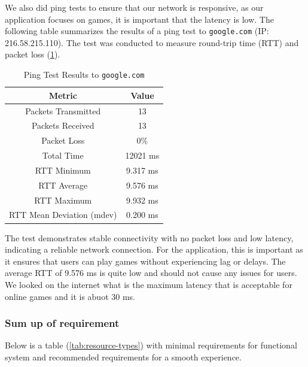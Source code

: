 \documentclass[]{VUMIFTemplateClass}
\begin{document}
We also did ping tests to ensure that our network is responsive, as our application focuses on games, it is important that the latency is low.
The following table summarizes the results of a ping test to \texttt{google.com} (IP: 216.58.215.110). The test was conducted to measure round-trip time (RTT) and packet loss (\ref{tab:ping-test-results}).
\begin{table}[H]
    \centering
    \begin{tabular}{|c|c|}
        \hline
        \textbf{Metric} & \textbf{Value} \\
        \hline
        Packets Transmitted & 13 \\
        \hline
        Packets Received & 13 \\
        \hline
        Packet Loss & 0\% \\
        \hline
        Total Time & 12021 ms \\
        \hline
        RTT Minimum & 9.317 ms \\
        \hline
        RTT Average & 9.576 ms \\
        \hline
        RTT Maximum & 9.932 ms \\
        \hline
        RTT Mean Deviation (mdev) & 0.200 ms \\
        \hline
    \end{tabular}
    \caption{Ping Test Results to \texttt{google.com}}
    \label{tab:ping-test-results}
\end{table}

The test demonstrates stable connectivity with no packet loss and low latency, indicating a reliable network connection. 
For the application, this is important as it ensures that users can play games without experiencing lag or delays. 
The average RTT of 9.576 ms is quite low and should not cause any issues for users.
We looked on the internet what is the maximum latency that is acceptable for online games and it is abuot 30 ms.


\subsubsection{Sum up of requirement}
Below is a table (\ref{tab:resource-types}) with minimal requirements for functional system and recommended requirements for a smooth experience.
\end{document}
